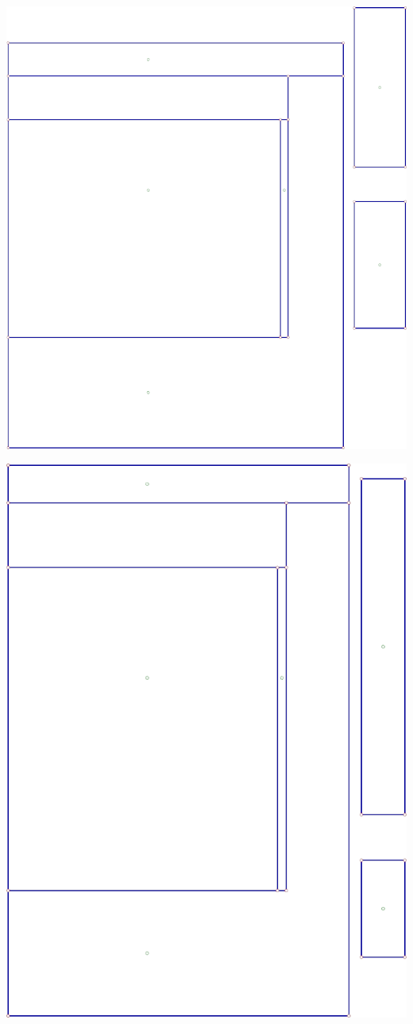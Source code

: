 \documentclass[portrait, a1paper, fontscale=0.5]{baposter}
\begin{document}
\begin{poster}
{\begin{center}
\begin{minipage}{9em}
		\includegraphics[scale=0.125]{optimization/variant_3.png}
	\end{minipage}
	\begin{minipage}{8em}
		\centering
		\includegraphics[scale=0.125]{optimization/variant_4.png}

\end{minipage}
\end{center}}
\end{poster}
\end{document}
